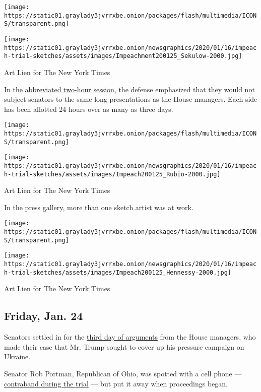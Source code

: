 \texttt{[image: https://static01.graylady3jvrrxbe.onion/packages/flash/multimedia/ICONS/transparent.png]}

\texttt{[image: https://static01.graylady3jvrrxbe.onion/newsgraphics/2020/01/16/impeach-trial-sketches/assets/images/Impeachment200125\_Sekulow-2000.jpg]}

Art Lien for The New York Times

In the
\href{https://www.nytimes3xbfgragh.onion/2020/01/25/us/politics/trump-impeachment-hearings-saturday.html}{abbreviated
two-hour session}, the defense emphasized that they would not subject
senators to the same long presentations as the House managers. Each side
has been allotted 24 hours over as many as three days.

\texttt{[image: https://static01.graylady3jvrrxbe.onion/packages/flash/multimedia/ICONS/transparent.png]}

\texttt{[image: https://static01.graylady3jvrrxbe.onion/newsgraphics/2020/01/16/impeach-trial-sketches/assets/images/Impeach200125\_Rubio-2000.jpg]}

Art Lien for The New York Times

In the press gallery, more than one sketch artist was at work.

\texttt{[image: https://static01.graylady3jvrrxbe.onion/packages/flash/multimedia/ICONS/transparent.png]}

\texttt{[image: https://static01.graylady3jvrrxbe.onion/newsgraphics/2020/01/16/impeach-trial-sketches/assets/images/Impeach200125\_Hennessy-2000.jpg]}

Art Lien for The New York Times

\hypertarget{friday-jan-24}{%
\subsection{Friday, Jan. 24}\label{friday-jan-24}}

Senators settled in for the
\href{https://www.nytimes3xbfgragh.onion/2020/01/24/us/politics/trump-impeachment-hearings-today.html?action=click\&module=Top\%20Stories\&pgtype=Homepage}{third
day of arguments} from the House managers, who made their case that Mr.
Trump sought to cover up his pressure campaign on Ukraine.

Senator Rob Portman, Republican of Ohio, was spotted with a cell phone
---
\href{https://www.nytimes3xbfgragh.onion/2020/01/17/us/politics/senate-impeachment-trial-furniture.html}{contraband
during the trial} --- but put it away when proceedings began.

